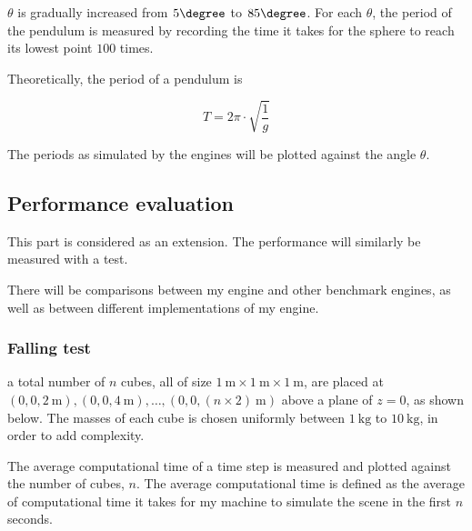\documentclass[runningheads]{llncs}
\begin{document}
$\theta$ is gradually increased from $5\degree$ to $85\degree$.
For each $\theta$, 
the period of the pendulum is measured by recording the time it takes for the sphere to reach its lowest point $100$ times.

Theoretically, the period of a pendulum is

\begin{equation}
T = 2  \pi \cdot \sqrt{\frac{1}{g}}
\end{equation}

The periods as simulated by the engines will be plotted against the angle $\theta$.

\subsection{Performance evaluation}

This part is considered as an extension. The performance will similarly be measured with a test.

There will be comparisons between my engine and other benchmark engines, as well as between different implementations of my engine.

\subsubsection{Falling test}

a total number of $n$ cubes, all of size $\SI{1}{\m} \times \SI{1}{\m} \times \SI{1}{\m}$, 
are placed at $(0, 0, \SI{2}{\m}), (0, 0, \SI{4}{\m}), \ldots, (0, 0, (n \times 2)\SI{}{\m})$ above a plane of $z = 0$, 
as shown below.
The masses of each cube is chosen uniformly between $\SI{1}{\kg}$ to $\SI{10}{\kg}$, in order to add complexity.

\begin{center}
\end{center}

The average computational time of a time step is measured and plotted against the number of cubes, $n$.
The average computational time is defined as the average of computational time 
it takes for my machine to simulate the scene in the first $n$ seconds.
\end{document}
